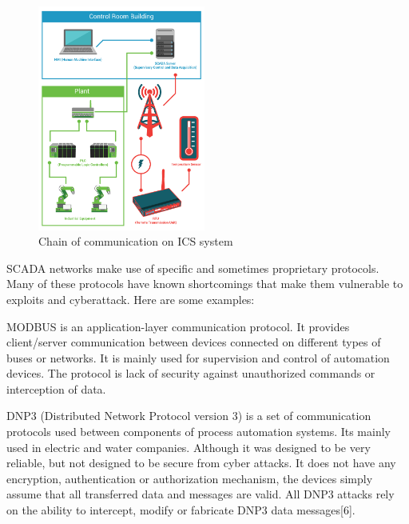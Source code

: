 \documentclass[conference]{IEEEtran}
\begin{document}
\begin{figure}[!htb]
	\includegraphics[width=0.49\textwidth]{images/SCADA5.png}
	\caption{ Chain of communication on ICS system}
	\label{fig:TCPIP}
\end{figure}
SCADA networks make use of specific and sometimes proprietary protocols. Many
of these protocols have known shortcomings that make them vulnerable to exploits and cyberattack.
Here are some examples:

MODBUS is an application-layer communication protocol. It provides client/server
communication between devices connected on different types of buses or networks.
It is mainly used for supervision and control of automation devices. The protocol is lack of security against unauthorized commands or interception of
data.

DNP3 (Distributed Network Protocol version 3) is a set of communication protocols used
between components of process automation systems. Its mainly used in electric and water companies. Although it was designed to be very reliable, but not designed to be secure from cyber attacks. It does not have any encryption, authentication or
authorization mechanism, the devices simply assume that all transferred data and messages are valid. All DNP3 attacks rely on the ability to intercept, modify or fabricate DNP3 data messages[6].
\end{document}
